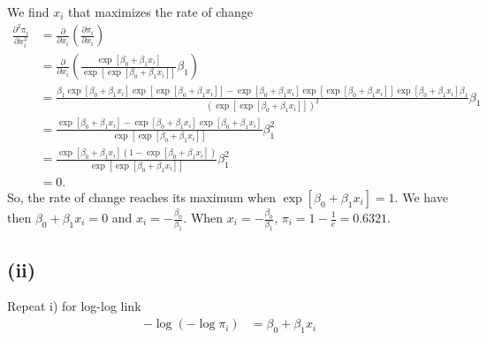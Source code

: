 We find $x_{i}$ that maximizes the rate of change
\begin{align*}
\frac{\partial^{2} \pi_{i}}{\partial x_{i}^{2}} &= \frac{\partial}{\partial x_{i}}\left(\frac{\partial \pi_{i}}{\partial x_{i}}\right)\\
&= \frac{\partial}{\partial x_{i}}\left(\frac{\exp\left[\beta_{0} + \beta_{1}x_{i}\right]}{\exp\left[\exp\left[\beta_{0} + \beta_{1}x_{i}\right]\right]}\beta_{1}\right)\\
&= \frac{\beta_{1} \exp\left[\beta_{0} + \beta_{1}x_{i}\right]\exp\left[\exp\left[\beta_{0} + \beta_{1}x_{i}\right]\right] - \exp\left[\beta_{0} + \beta_{1}x_{i}\right] \exp\left[\exp\left[\beta_{0} + \beta_{1}x_{i}\right]\right] \exp\left[\beta_{0} + \beta_{1}x_{i}\right] \beta_{1}}{\left(\exp\left[\exp\left[\beta_{0} + \beta_{1}x_{i}\right]\right]\right)^{2}}\beta_{1}\\
&= \frac{\exp\left[\beta_{0} + \beta_{1}x_{i}\right] - \exp\left[\beta_{0} + \beta_{1}x_{i}\right] \exp\left[\beta_{0} + \beta_{1}x_{i}\right] }{\exp\left[\exp\left[\beta_{0} + \beta_{1}x_{i}\right]\right]}\beta_{1}^{2}\\
&= \frac{\exp\left[\beta_{0} + \beta_{1}x_{i}\right]\left(1 - \exp\left[\beta_{0} + \beta_{1}x_{i}\right]\right)}{\exp\left[\exp\left[\beta_{0} + \beta_{1}x_{i}\right]\right]}\beta_{1}^{2}\\
&= 0.
\end{align*}
So, the rate of change reaches its maximum when $\exp\left[\beta_{0} + \beta_{1}x_{i}\right] = 1$. We have then $\beta_{0} + \beta_{1}x_{i} = 0$ and $x_{i} = -\frac{\beta_{0}}{\beta_{1}}$. When $x_{i} = -\frac{\beta_{0}}{\beta_{1}}$, $\pi_{i} = 1 - \frac{1}{e} = 0.6321$.\\

\subsection*{(ii)}
Repeat i) for log-log link
\begin{align*}
-\log\left(-\log\pi_{i}\right) &= \beta_{0} + \beta_{1}x_{i}\\
\end{align*}